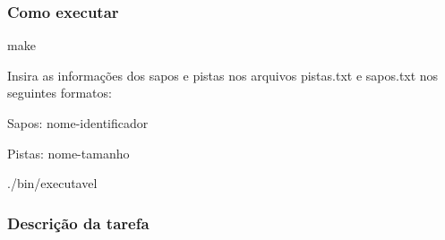 \subsubsection*{Como executar}


\begin{DoxyItemize}
\item make
\item Insira as informações dos sapos e pistas nos arquivos pistas.\+txt e sapos.\+txt nos seguintes formatos\+:
\begin{DoxyItemize}
\item Sapos\+: nome-\/identificador
\item Pistas\+: nome-\/tamanho
\end{DoxyItemize}
\item ./bin/executavel
\end{DoxyItemize}

\subsubsection*{Descrição da tarefa}

